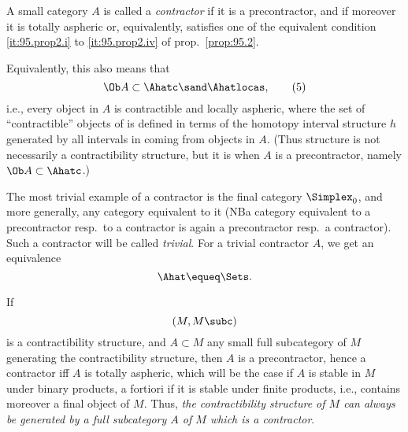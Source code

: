 \begin{definitionnum}\label{def:95.1}
  A small category $A$ is called a \emph{contractor} if it
  is a precontractor, and if moreover it is totally aspheric or,
  equivalently, satisfies one of the equivalent condition
  \ref{it:95.prop2.i} to \ref{it:95.prop2.iv} of prop.\
  \ref{prop:95.2}.
\end{definitionnum}

Equivalently, this also means that
\begin{equation}
  \label{eq:95.5}
  \Ob A \subset \Ahatc\sand \Ahatlocas,\tag{5}
\end{equation}
i.e., every object in $A$ is contractible and locally aspheric, where
the set \Ahatc{} of ``contractible'' objects of \Ahat{} is defined in
terms of the homotopy interval structure $h$ generated by all
intervals in \Ahat{} coming from objects in $A$. (Thus structure is
not necessarily a contractibility structure, but it is when $A$ is a
precontractor, namely $\Ob A\subset\Ahatc$.)

The most trivial example of a contractor is the final category
$\Simplex_0$, and more generally, any category equivalent to it
(NB\enspace a category equivalent to a precontractor resp.\ to a
contractor is again a precontractor resp.\ a contractor). Such a
contractor will be called \emph{trivial}. For a trivial contractor
$A$, we get an equivalence
\[\Ahat\equeq\Sets.\]

If
\[ (M,M\subc)\]
is a contractibility structure, and $A\subset M$ any small full
subcategory of $M$ generating the contractibility structure, then $A$
is a precontractor, hence a contractor if{f} $A$ is totally aspheric,
which will be the case if $A$ is stable in $M$ under binary products,
a fortiori if it is stable under finite products, i.e., contains
moreover a final object of $M$. Thus, \emph{the contractibility
  structure of $M$ can always be generated by a full subcategory $A$
  of $M$ which is a contractor}.

